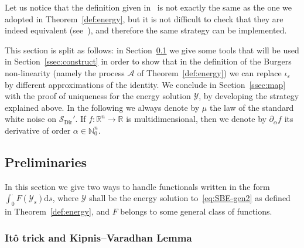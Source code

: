 \documentclass[AHL,Unicode,longabstracts]{cedram}
\DeclareMathOperator{\Dir}{Dir}
\newcommand{\bb}[1]{{\mathbb #1}}
\newcommand{\mc}[1]{{\mathcal #1}}
\renewcommand{\mc}[1]{{\mathcal #1}}
\newcommand{\SD}{\ensuremath{\mc S_{\Dir}}}
\newcommand*{\dd}{\mathrm{d}}
\newcommand*{\ds}{\dd s}
\begin{document}
\begin{rema}
Let us notice that the definition given in~\cite{Gubinelli2015Energy} is not exactly the same as the one we adopted in Theorem~\ref{def:energy}, but it is not difficult to check that they are indeed equivalent (see~\cite[Proposition~4]{GJSi}), and therefore the same strategy can be implemented.
\end{rema}


This section is split as follows: in Section~\ref{ssec:preli} we give some tools that will be used in Section~\ref{ssec:construct} in order to show that in the definition of the Burgers non-linearity (namely the process $\mc A$ of Theorem~\ref{def:energy}) we can replace $\iota_\varepsilon$ by different approximations of the identity. We conclude in Section~\ref{ssec:map} with the proof of uniqueness for the energy solution $\mc Y$, by developing the strategy explained above. In the following we always denote by $\mu$ the law of the standard white noise on $\SD'$. If $f\colon\bb R^n\to\bb R$ is multidimensional, then we denote by $\partial_\alpha f$ its derivative of order $\alpha \in \bb N_0^n$.



\subsection{Preliminaries} \label{ssec:preli}
In this section we give two ways to handle functionals written in the form\linebreak $\int_0^\cdot F(\mc Y_s)\ds$, where $\mc Y$ shall be the energy solution to~\eqref{eq:SBE-gen2} as defined in Theorem~\ref{def:energy}, and $F$ belongs to some general class of functions.

\subsubsection{It\^o trick and Kipnis--Varadhan Lemma}
\end{document}
